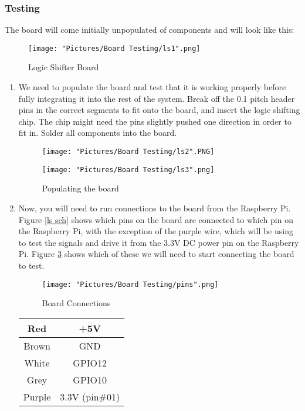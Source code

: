 \documentclass[12pt]{article}
\begin{document}
\subsubsection{Testing}

The board will come initially unpopulated of components and will look like this:

\begin{figure}[H]
  	\centering
    	\texttt{[image: "Pictures/Board Testing/ls1".png]}
 	\caption{Logic Shifter Board}
	\label{ls1}
\end{figure}

\begin{enumerate}

	\item We need to populate the board and test that it is working properly before fully integrating it into the rest of the system. Break off the 0.1 pitch header pins in the correct segments to fit onto the board, and insert the logic shifting chip. The chip might need the pins slightly pushed one direction in order to fit in. Solder all components into the board.

\begin{figure}[H]
 	\centering
  	\begin{minipage}[b]{0.45\textwidth}
		\texttt{[image: "Pictures/Board Testing/ls2".PNG]}
  	\end{minipage}
  	\hfill
  	\begin{minipage}[b]{0.45\textwidth}
    		\texttt{[image: "Pictures/Board Testing/ls3".png]}
  	\end{minipage}
	\caption{Populating the board}
	\label{ls2}
\end{figure}

	\item Now, you will need to run connections to the board from the Raspberry Pi. Figure \ref{ls sch} shows which pins on the board are connected to which pin on the Raspberry Pi, with the exception of the purple wire, which will be using to test the signals and drive it from the 3.3V DC power pin on the Raspberry Pi. Figure \ref{ls4} shows which of these we will need to start connecting the board to test.

\begin{figure}[H]
  	\centering
    	\texttt{[image: "Pictures/Board Testing/pins".png]}
 	\caption{Board Connections}
	\label{ls4}
\end{figure}

\begin{center}
\begin{tabular}[2]{| c | c |}	
	\hline
	Red & +5V \\ \hline
	Brown & GND \\ \hline
	White & GPIO12 \\ \hline
	Grey & GPIO10 \\ \hline
	Purple & 3.3V (pin\#01) \\ \hline
\end{tabular}	
\end{center}


\end{enumerate}
\end{document}
